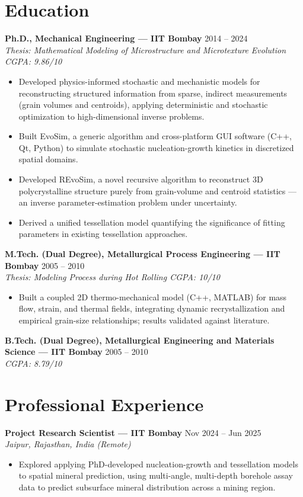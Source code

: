\documentclass[10.5pt,a4paper]{article}
\newenvironment{tightitemize}
  {\begin{itemize}[leftmargin=1.2em,itemsep=1pt,topsep=2pt,parsep=0pt]}
  {\end{itemize}}
\newcommand{\entry}[3]{%
  \par\noindent\textbf{#1} \hfill #2\\
  {\itshape\small #3}\par\smallskip
}
\begin{document}
\section{Education}

\entry{Ph.D., Mechanical Engineering --- IIT Bombay}{2014 -- 2024}{Thesis: Mathematical Modeling of Microstructure and Microtexture Evolution \quad CGPA: 9.86/10}
\begin{tightitemize}
\item Developed physics-informed stochastic and mechanistic models for reconstructing structured information from sparse, indirect measurements (grain volumes and centroids), applying deterministic and stochastic optimization to high-dimensional inverse problems.
\item Built EvoSim, a generic algorithm and cross-platform GUI software (C++, Qt, Python) to simulate stochastic nucleation-growth kinetics in discretized spatial domains.
\item Developed REvoSim, a novel recursive algorithm to reconstruct 3D polycrystalline structure purely from grain-volume and centroid statistics --- an inverse parameter-estimation problem under uncertainty.
\item Derived a unified tessellation model quantifying the significance of fitting parameters in existing tessellation approaches.
\end{tightitemize}

\entry{M.Tech. (Dual Degree), Metallurgical Process Engineering --- IIT Bombay}{2005 -- 2010}{Thesis: Modeling Process during Hot Rolling \quad CGPA: 10/10}
\begin{tightitemize}
\item Built a coupled 2D thermo-mechanical model (C++, MATLAB) for mass flow, strain, and thermal fields, integrating dynamic recrystallization and empirical grain-size relationships; results validated against literature.
\end{tightitemize}

\entry{B.Tech. (Dual Degree), Metallurgical Engineering and Materials Science --- IIT Bombay}{2005 -- 2010}{CGPA: 8.79/10}

\section{Professional Experience}

\entry{Project Research Scientist --- IIT Bombay}{Nov 2024 -- Jun 2025}{Jaipur, Rajasthan, India (Remote)}
\begin{tightitemize}
\item Explored applying PhD-developed nucleation-growth and tessellation models to spatial mineral prediction, using multi-angle, multi-depth borehole assay data to predict subsurface mineral distribution across a mining region.
\end{tightitemize}
\end{document}
